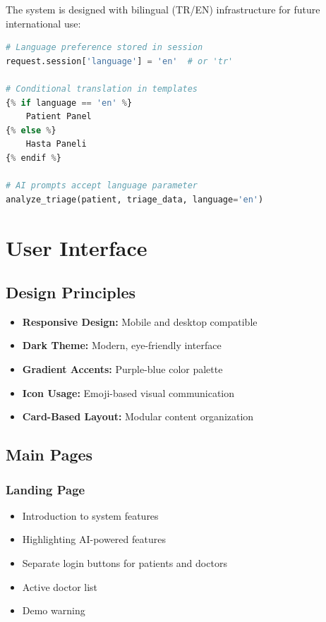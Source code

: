 \documentclass[12pt,a4paper]{article}
\begin{document}
The system is designed with bilingual (TR/EN) infrastructure for future international use:

\begin{lstlisting}[language=Python, caption=Language Management]
# Language preference stored in session
request.session['language'] = 'en'  # or 'tr'

# Conditional translation in templates
{% if language == 'en' %}
    Patient Panel
{% else %}
    Hasta Paneli
{% endif %}

# AI prompts accept language parameter
analyze_triage(patient, triage_data, language='en')
\end{lstlisting}

\section{User Interface}

\subsection{Design Principles}
\begin{itemize}
    \item \textbf{Responsive Design:} Mobile and desktop compatible
    \item \textbf{Dark Theme:} Modern, eye-friendly interface
    \item \textbf{Gradient Accents:} Purple-blue color palette
    \item \textbf{Icon Usage:} Emoji-based visual communication
    \item \textbf{Card-Based Layout:} Modular content organization
\end{itemize}

\subsection{Main Pages}

\subsubsection{Landing Page}
\begin{itemize}
    \item Introduction to system features
    \item Highlighting AI-powered features
    \item Separate login buttons for patients and doctors
    \item Active doctor list
    \item Demo warning
\end{itemize}
\end{document}
